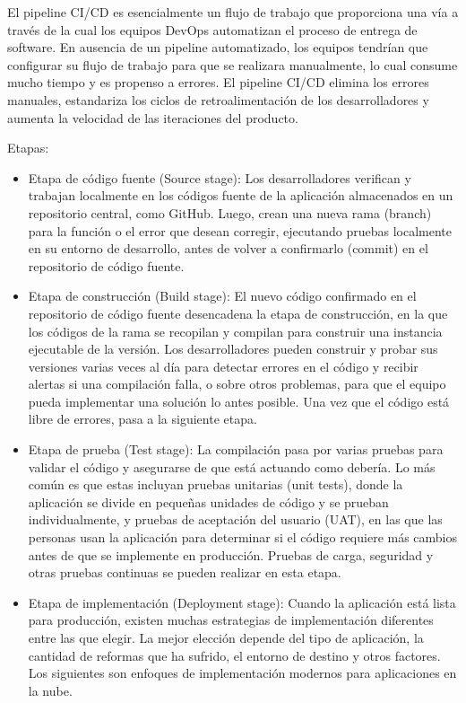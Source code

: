 \documentclass[12pt]{book}
\begin{document}
El pipeline CI/CD es esencialmente un flujo de trabajo que proporciona una vía a través de la cual los equipos DevOps automatizan el proceso de entrega de software.
En ausencia de un pipeline automatizado, los equipos tendrían que configurar su flujo de trabajo para que se realizara manualmente, lo cual consume mucho tiempo y es propenso a errores. El pipeline CI/CD elimina los errores manuales, estandariza los ciclos de retroalimentación de los desarrolladores y aumenta la velocidad de las iteraciones del producto.

Etapas:
\begin{itemize}
    \item Etapa de código fuente (Source stage): Los desarrolladores verifican y trabajan localmente en los códigos fuente de la aplicación almacenados en un repositorio central, como GitHub. Luego, crean una nueva rama (branch) para la función o el error que desean corregir, ejecutando pruebas localmente en su entorno de desarrollo, antes de volver a confirmarlo (commit) en el repositorio de código fuente.
    \item Etapa de construcción (Build stage): El nuevo código confirmado en el repositorio de código fuente desencadena la etapa de construcción, en la que los códigos de la rama se recopilan y compilan para construir una instancia ejecutable de la versión. Los desarrolladores pueden construir y probar sus versiones varias veces al día para detectar errores en el código y recibir alertas si una compilación falla, o sobre otros problemas, para que el equipo pueda implementar una solución lo antes posible. Una vez que el código está libre de errores, pasa a la siguiente etapa.
    \item Etapa de prueba (Test stage): La compilación pasa por varias pruebas para validar el código y asegurarse de que está actuando como debería. Lo más común es que estas incluyan pruebas unitarias (unit tests), donde la aplicación se divide en pequeñas unidades de código y se prueban individualmente, y pruebas de aceptación del usuario (UAT), en las que las personas usan la aplicación para determinar si el código requiere más cambios antes de que se implemente en producción. Pruebas de carga, seguridad y otras pruebas continuas se pueden realizar en esta etapa.
    \item Etapa de implementación (Deployment stage): Cuando la aplicación está lista para producción, existen muchas estrategias de implementación diferentes entre las que elegir. La mejor elección depende del tipo de aplicación, la cantidad de reformas que ha sufrido, el entorno de destino y otros factores. Los siguientes son enfoques de implementación modernos para aplicaciones en la nube.


\end{itemize}
\end{document}
